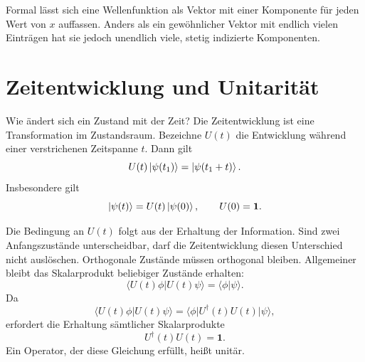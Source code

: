 Formal lässt sich eine Wellenfunktion als Vektor mit einer Komponente für jeden Wert von \(x\) auffassen. Anders als ein gewöhnlicher Vektor mit endlich vielen Einträgen hat sie jedoch unendlich viele, stetig indizierte Komponenten.

\begin{classroomqa}
\end{classroomqa}

\section{Zeitentwicklung und Unitarität}

Wie ändert sich ein Zustand mit der Zeit? Die Zeitentwicklung ist eine Transformation im Zustandsraum. Bezeichne \(U(t)\) die Entwicklung während einer verstrichenen Zeitspanne \(t\). Dann gilt
\begin{equation}
U(t)\left\lvert\psi(t_1)\right\rangle=\left\lvert\psi(t_1+t)\right\rangle.
\end{equation}
Insbesondere gilt
\begin{equation}
\left\lvert\psi(t)\right\rangle=U(t)\left\lvert\psi(0)\right\rangle,
\qquad
U(0)=\mathbf 1.
\end{equation}

Die Bedingung an \(U(t)\) folgt aus der Erhaltung der Information. Sind zwei Anfangszustände unterscheidbar, darf die Zeitentwicklung diesen Unterschied nicht auslöschen. Orthogonale Zustände müssen orthogonal bleiben. Allgemeiner bleibt das Skalarprodukt beliebiger Zustände erhalten:
\begin{equation}
\langle U(t)\phi|U(t)\psi\rangle
=\langle\phi|\psi\rangle.
\end{equation}
Da
\begin{equation}
\langle U(t)\phi|U(t)\psi\rangle
=\langle\phi|U^\dagger(t)U(t)|\psi\rangle,
\end{equation}
erfordert die Erhaltung sämtlicher Skalarprodukte
\begin{equation}
U^\dagger(t)U(t)=\mathbf 1.
\end{equation}
Ein Operator, der diese Gleichung erfüllt, heißt unitär.

\begin{classroomqa}
\end{classroomqa}

